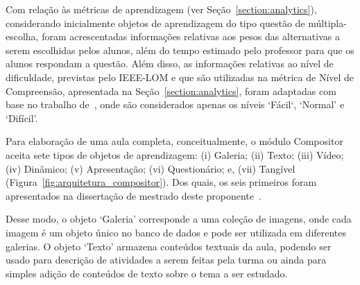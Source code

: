 Com relação às métricas de aprendizagem (ver Seção~\ref{section:analytics}), considerando inicialmente objetos de aprendizagem do tipo questão de múltipla-escolha, foram acrescentadas informações relativas aos pesos das alternativas a serem escolhidas pelos alunos, além do tempo estimado pelo professor para que os alunos respondam a questão. Além disso, as informações relativas ao nível de dificuldade, previstas pelo IEEE-LOM e que são utilizadas na métrica de Nível de Compreensão, apresentada na Seção~\ref{section:analytics}, foram adaptadas com base no trabalho de~\cite{Biswas:2007}, onde são considerados apenas os níveis `Fácil`, `Normal' e `Difícil'.


Para elaboração de uma aula completa, conceitualmente, o módulo Compositor aceita sete tipos de objetos de aprendizagem: (i) Galeria; (ii) Texto; (iii) Vídeo; (iv) Dinâmico; (v) Apresentação; (vi) Questionário; e, (vii) Tangível (Figura~\ref{fig:arquitetura_compositor}). Dos quais, os seis primeiros foram apresentados na dissertação de mestrado deste proponente~\citep{leitao:2017}.



Desse modo, o objeto `Galeria' corresponde a uma coleção de imagens, onde cada imagem é um objeto único no banco de dados e pode ser utilizada em diferentes galerias. O objeto `Texto' armazena conteúdos textuais da aula, podendo ser usado para descrição de atividades a serem feitas pela turma ou ainda para simples adição de conteúdos de texto sobre o tema a ser estudado.

